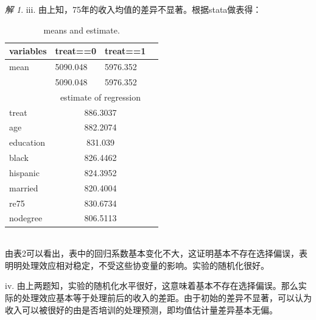 \documentclass[a4paper]{ctexart}
\theoremstyle{remark}
\newtheorem*{solution}{解}
\begin{document}
\begin{itemize}
\begin{solution}
    iii. 由上知，75年的收入均值的差异不显著。根据stata做表得：
    \begin{table}[h]
        \centering
        \begin{tabular}{llll}%
            \hline
            variables & treat==0& treat==1 \\   
            \hline
            mean & 5090.048 & 5976.352 \\
             & 5090.048 & 5976.352 \\
             \hline
             & \multicolumn{2}{c}{estimate of regression}\\
            \hline
            treat & \multicolumn{2}{c}{886.3037}\\
            age & \multicolumn{2}{c}{882.2074}\\
    
            education & \multicolumn{2}{c}{831.039} \\

            black & \multicolumn{2}{c}{826.4462}\\

            hispanic & \multicolumn{2}{c}{824.3952}  \\

            married & \multicolumn{2}{c}{820.4004} \\    

            re75 & \multicolumn{2}{c}{830.6734} \\   

            nodegree &\multicolumn{2}{c}{806.5113} \\
            \hline
        \end{tabular} 
        \caption{\label{font-table} means and estimate. }
    \end{table}\\
    由表2可以看出，表中的回归系数基本变化不大，这证明基本不存在选择偏误，表明明处理效应相对稳定，不受这些协变量的影响。实验的随机化很好。
    


    iv. 由上两题知，实验的随机化水平很好，这意味着基本不存在选择偏误。那么实际的处理效应基本等于处理前后的收入的差距。由于初始的差异不显著，可以认为收入可以被很好的由是否培训的处理预测，即均值估计量差异基本无偏。
    \\
    

\end{solution}
\end{itemize}
\end{document}
